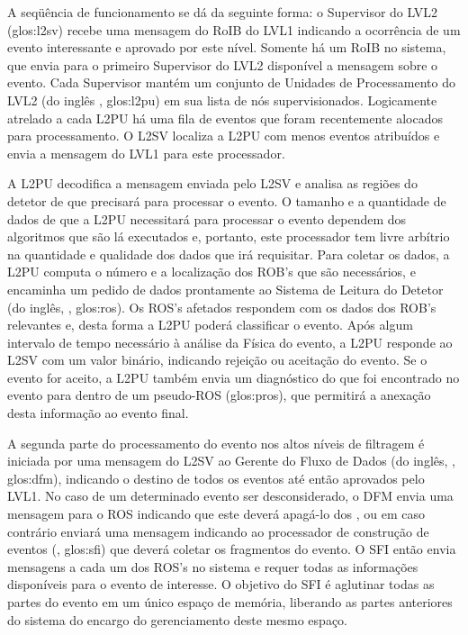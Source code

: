 A seqüência de funcionamento se dá da seguinte forma: o Supervisor do LVL2
(\gls{glos:l2sv}) recebe uma mensagem do RoIB do LVL1 indicando a ocorrência
de um evento interessante e aprovado por este nível. Somente há um RoIB no
sistema, que envia para o primeiro Supervisor do LVL2 disponível a mensagem
sobre o evento. Cada Supervisor mantém um conjunto de Unidades de
Processamento do LVL2 (do inglês , \gls{glos:l2pu})
em sua lista de nós supervisionados. Logicamente atrelado a cada L2PU há uma
fila de eventos que foram recentemente alocados para processamento. O L2SV
localiza a L2PU com menos eventos atribuídos e envia a mensagem do LVL1 para
este processador.

A L2PU decodifica a mensagem enviada pelo L2SV e analisa as regiões do detetor
de que precisará para processar o evento. O tamanho e a quantidade de dados de
que a L2PU necessitará para processar o evento dependem dos algoritmos que são
lá executados e, portanto, este processador tem livre arbítrio na quantidade e
qualidade dos dados que irá requisitar. Para coletar os dados, a L2PU computa
o número e a localização dos ROB's que são necessários, e encaminha um pedido
de dados prontamente ao Sistema de Leitura do Detetor (do inglês, , \gls{glos:ros}). Os ROS's afetados respondem com os dados dos ROB's
relevantes e, desta forma a L2PU poderá classificar o evento. Após algum
intervalo de tempo necessário à análise da Física do evento, a L2PU responde
ao L2SV com um valor binário, indicando rejeição ou aceitação do evento. Se o
evento for aceito, a L2PU também envia um diagnóstico do que foi encontrado no
evento para dentro de um pseudo-ROS (\gls{glos:pros}), que permitirá a
anexação desta informação ao evento final.

A segunda parte do processamento do evento nos altos níveis de filtragem é
iniciada por uma mensagem do L2SV ao Gerente do Fluxo de Dados (do inglês,
, \gls{glos:dfm}), indicando o destino de todos os eventos até
então aprovados pelo LVL1. No caso de um determinado evento ser
desconsiderado, o DFM envia uma mensagem para o ROS indicando que este deverá
apagá-lo dos , ou em caso contrário enviará uma mensagem
indicando ao processador de construção de eventos (,
\gls{glos:sfi}) que deverá coletar os fragmentos do evento. O SFI então envia
mensagens a cada um dos ROS's no sistema e requer todas as informações
disponíveis para o evento de interesse. O objetivo do SFI é aglutinar todas as
partes do evento em um único espaço de memória, liberando as partes anteriores
do sistema do encargo do gerenciamento deste mesmo espaço.

